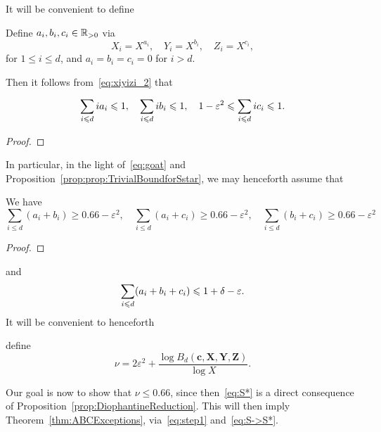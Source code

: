 It will be convenient to define
\begin{definition} \label{def:aibici}
Define $a_i,b_i,c_i\in \mathbb{R}_{>0}$ via
\[
X_i=X^{a_i}, \quad Y_i=X^{b_i}, \quad Z_i=X^{c_i},
\]
for $1\leq i\leq d$, and $a_i=b_i=c_i=0$ for $i>d$.
\end{definition}
 Then it follows from~\eqref{eq:xiyizi_2} that
\begin{lemma}\label{lem:aibiciconstraints}
\begin{equation}\label{eq:oat1}
\sum_{i\leqslant d} ia_i \leqslant 1, \quad \sum_{i\leqslant d} ib_i \leqslant 1, \quad 1-\varepsilon^2\leqslant \sum_{i\leqslant d} ic_i \leqslant 1.
\end{equation}
\end{lemma}
\begin{proof}
\end{proof}
In particular, in the light of~\eqref{eq:goat} and
 Proposition~\ref{prop:prop:TrivialBoundforSstar}, we
may henceforth assume that
\begin{lemma} \label{lem:Trivialaibici}
We have
\begin{equation}\label{eq:oat4}
\sum_{i\leq d} (a_i+b_i)\geq 0.66-\varepsilon^2,\quad \sum_{i\leq d} (a_i+c_i)\geq 0.66-\varepsilon^2,\quad
\sum_{i\leq d} (b_i+c_i) \geq 0.66-\varepsilon^2
\end{equation}
\end{lemma}
\begin{proof}
\end{proof}
and
\begin{equation}\label{eq:oat3}
\sum_{i\leqslant d} (a_i+b_i+c_i) \leqslant 1+\delta-\varepsilon.
\end{equation}
It will be convenient to henceforth
\begin{definition}\label{def:nu}
define
\[
\nu=2\varepsilon^2+\frac{\log B_d(\mathbf{c},\mathbf{X},\mathbf{Y},\mathbf{Z})}{\log X}.
\]
\end{definition}
Our goal is now to show that $\nu\le 0.66$, since then~\eqref{eq:S*}
is a direct consequence of
Proposition~\ref{prop:DiophantineReduction}.
This will then imply
Theorem~\ref{thm:ABCExceptions}, via~\eqref{eq:step1} and~\eqref{eq:S->S*}.


